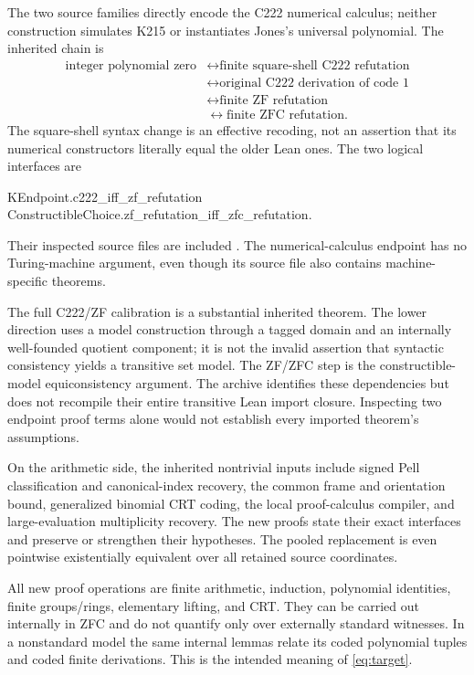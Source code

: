 \documentclass[10pt,letterpaper]{article}
\theoremstyle{definition}\newtheorem{definition}[theorem]{Definition}
\theoremstyle{remark}\newtheorem{remark}[theorem]{Remark}
\begin{document}
The two source families directly encode the C222 numerical calculus;
neither construction simulates K215 or instantiates Jones's universal
polynomial. The inherited chain is
\begin{align*}
 \text{integer polynomial zero}
 &\longleftrightarrow\text{finite square-shell C222 refutation}\\
 &\longleftrightarrow\text{original C222 derivation of code 1}\\
 &\longleftrightarrow\text{finite ZF refutation}\\
 &\longleftrightarrow\text{finite ZFC refutation}.
\end{align*}
The square-shell syntax change is an effective recoding, not an assertion
that its numerical constructors literally equal the older Lean ones.
The two logical interfaces are
\begin{center}\small\ttfamily
KEndpoint.c222\_iff\_zf\_refutation\\
ConstructibleChoice.zf\_refutation\_iff\_zfc\_refutation.
\end{center}
Their inspected source files are included \cite{endpoint,choice}.
The numerical-calculus endpoint has no Turing-machine argument, even
though its source file also contains machine-specific theorems.

The full C222/ZF calibration is a substantial inherited theorem. The
lower direction uses a model construction through a tagged domain and
an internally well-founded quotient component; it is not the invalid
assertion that syntactic consistency yields a transitive set model.
The ZF/ZFC step is the constructible-model equiconsistency argument.
The archive identifies these dependencies but does not recompile their
entire transitive Lean import closure. Inspecting two endpoint proof
terms alone would not establish every imported theorem's assumptions.

On the arithmetic side, the inherited nontrivial inputs include signed
Pell classification and canonical-index recovery, the common frame and
orientation bound, generalized binomial CRT coding, the local
proof-calculus compiler, and large-evaluation multiplicity recovery.
The new proofs state their exact interfaces and preserve or strengthen
their hypotheses. The pooled replacement is even pointwise
existentially equivalent over all retained source coordinates.

All new proof operations are finite arithmetic, induction, polynomial
identities, finite groups/rings, elementary lifting, and CRT. They can
be carried out internally in ZFC and do not quantify only over
externally standard witnesses. In a nonstandard model the same internal
lemmas relate its coded polynomial tuples and coded finite derivations.
This is the intended meaning of \eqref{eq:target}.
\end{document}
